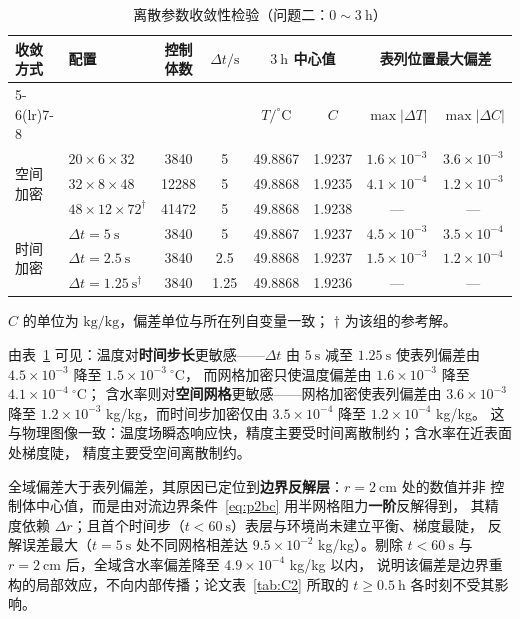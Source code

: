 \documentclass[12pt,a4paper]{ctexart}
\begin{document}
\begin{table}[H]
\centering
\small
\setlength{\tabcolsep}{4pt}
\begin{tabular}{llcccccc}
\toprule
收敛方式 & 配置 & 控制体数 & $\Delta t/\mathrm{s}$ &
\multicolumn{2}{c}{$3\ \mathrm{h}$ 中心值} & \multicolumn{2}{c}{表列位置最大偏差} \\
\cmidrule(lr){5-6}\cmidrule(lr){7-8}
 & & & & $T/^\circ\mathrm{C}$ & $C$ & $\max|\Delta T|$ & $\max|\Delta C|$ \\
\midrule
\multirow{3}{*}{空间加密}
 & $20\times6\times32$ & 3840 & 5 & 49.8867 & 1.9237 & $1.6\times10^{-3}$ & $3.6\times10^{-3}$ \\
 & $32\times8\times48$ & 12288 & 5 & 49.8868 & 1.9235 & $4.1\times10^{-4}$ & $1.2\times10^{-3}$ \\
 & $48\times12\times72^{\dagger}$ & 41472 & 5 & 49.8868 & 1.9238 & — & — \\
\midrule
\multirow{3}{*}{时间加密}
 & $\Delta t=5\ \mathrm{s}$  & 3840 & 5 & 49.8867 & 1.9237 & $4.5\times10^{-3}$ & $3.5\times10^{-4}$ \\
 & $\Delta t=2.5\ \mathrm{s}$ & 3840 & 2.5 & 49.8868 & 1.9237 & $1.5\times10^{-3}$ & $1.2\times10^{-4}$ \\
 & $\Delta t=1.25\ \mathrm{s}^{\dagger}$ & 3840 & 1.25 & 49.8868 & 1.9236 & — & — \\
\bottomrule
\end{tabular}

\vspace{2pt}
{\footnotesize $C$ 的单位为 $\mathrm{kg/kg}$，偏差单位与所在列自变量一致；
$\dagger$ 为该组的参考解。}
\caption{离散参数收敛性检验（问题二：$0\sim3\ \mathrm{h}$）}
\label{tab:app_conv}
\end{table}

由表~\ref{tab:app_conv} 可见：温度对\textbf{时间步长}更敏感——$\Delta t$ 由 $5\ \mathrm{s}$ 减至
$1.25\ \mathrm{s}$ 使表列偏差由 $4.5\times10^{-3}$ 降至 $1.5\times10^{-3}\ {}^\circ\mathrm{C}$，
而网格加密只使温度偏差由 $1.6\times10^{-3}$ 降至 $4.1\times10^{-4}\ {}^\circ\mathrm{C}$；
含水率则对\textbf{空间网格}更敏感——网格加密使表列偏差由 $3.6\times10^{-3}$ 降至
$1.2\times10^{-3}$ kg/kg，而时间步加密仅由 $3.5\times10^{-4}$ 降至 $1.2\times10^{-4}$ kg/kg。
这与物理图像一致：温度场瞬态响应快，精度主要受时间离散制约；含水率在近表面处梯度陡，
精度主要受空间离散制约。

全域偏差大于表列偏差，其原因已定位到\textbf{边界反解层}：$r=2\ \mathrm{cm}$ 处的数值并非
控制体中心值，而是由对流边界条件~\eqref{eq:p2bc} 用半网格阻力\textbf{一阶}反解得到，
其精度依赖 $\Delta r$；且首个时间步（$t<60\ \mathrm{s}$）表层与环境尚未建立平衡、梯度最陡，
反解误差最大（$t=5\ \mathrm{s}$ 处不同网格相差达 $9.5\times10^{-2}$ kg/kg）。剔除
$t<60\ \mathrm{s}$ 与 $r=2\ \mathrm{cm}$ 后，全域含水率偏差降至 $4.9\times10^{-4}$ kg/kg 以内，
说明该偏差是边界重构的局部效应，不向内部传播；论文表~\ref{tab:C2} 所取的
$t\ge0.5\ \mathrm{h}$ 各时刻不受其影响。
\end{document}
